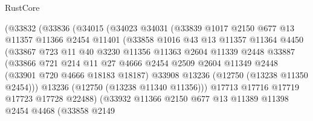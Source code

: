 \begin{lexlean}{RustCore}
\begin{coremodule}
                    (@33832
                      (@33836
                        (@34015
                          (@34023
                            @34031
                            (@33839
                              @1017
                              @2150
                              @677
                              @13
                              @11357
                              @11366
                              @2454
                              @11401
                              (@33858
                                @1016
                                @43
                                @13
                                @11357
                                @11364
                                @4450
                                (@33867
                                  @723
                                  @11
                                  @40
                                  @3230
                                  @11356
                                  @11363
                                  @2604
                                  @11339
                                  @2448
                                  @33887
                                  (@33866
                                    @721
                                    @214
                                    @11
                                    @27
                                    @4666
                                    @2454
                                    @2509
                                    @2604
                                    @11349
                                    @2448
                                    (@33901 @720 @4666 @18183 @18187)
                                    @33908
                                    @13236
                                    (@12750 (@13238 @11350 @2454)))
                                  @13236
                                  (@12750 (@13238 @11340 @11356)))
                                @17713
                                @17716
                                @17719
                                @17723
                                @17728
                                @22488)
                              (@33932
                                @11366
                                @2150
                                @677
                                @13
                                @11389
                                @11398
                                @2454
                                @4468
                                (@33858
                                  @2149

\end{coremodule}
\end{lexlean}
